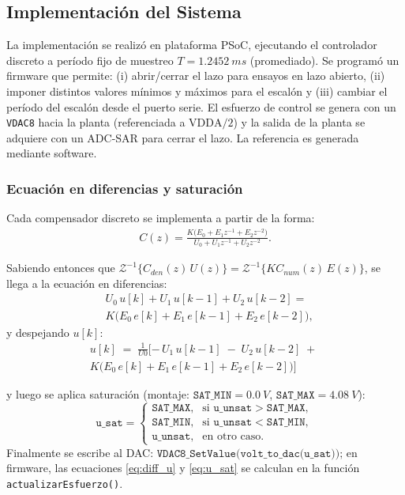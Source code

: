 \subsection{Implementación del Sistema}
La implementación se realizó en plataforma PSoC, ejecutando el controlador discreto a período fijo de muestreo \(T=\SI{1.2452}{ms}\) (promediado). Se programó un firmware que permite: (i) abrir/cerrar el lazo para ensayos en lazo abierto, (ii) imponer distintos valores mínimos y máximos para el escalón y (iii) cambiar el período del escalón desde el puerto serie. El esfuerzo de control se genera con un \texttt{VDAC8} hacia la planta (referenciada a \(\mathrm{VDDA}/2\)) y la salida de la planta se adquiere con un ADC-SAR para cerrar el lazo. La referencia es generada mediante software.

\subsubsection{Ecuación en diferencias y saturación}
Cada compensador discreto se implementa a partir de la forma:
\begin{equation}
	\label{eq:Cz_form}
	\begin{split}
		C(z)
		= \frac{K\big(E_0 + E_1 z^{-1} + E_2 z^{-2}\big)}
		{U_0 + U_1 z^{-1} + U_2 z^{-2}}.
	\end{split}
\end{equation}

Sabiendo entonces que \(\mathcal{Z}^{-1}\!\big\{C_{den}(z)\,U(z)\big\}=\mathcal{Z}^{-1}\!\big\{KC_{num}(z)\,E(z)\big\}\), se llega a la ecuación en diferencias:
\begin{equation}
	\label{eq:diff_balance}
	\begin{aligned}
		&U_0\,u[k] + U_1\,u[k-1] + U_2\,u[k-2]
		=\\
		 & K\Big(E_0\,e[k] + E_1\,e[k-1] + E_2\,e[k-2]\Big),
	\end{aligned}
\end{equation}
y despejando \(u[k]\):
\begin{equation}
	\label{eq:diff_u}
	\begin{split}
		u[k] \;=\;\frac{1}{U0}[
		-\,U_1\,u[k-1] \;-\; U_2\,u[k-2]
			\;+\; \\K\big(E_0\,e[k] + E_1\,e[k-1] + E_2\,e[k-2]\big)]
	\end{split}
\end{equation}


y luego se aplica saturación (montaje: \(\texttt{SAT\_MIN}=\SI{0.0}{V}\), \(\texttt{SAT\_MAX}=\SI{4.08}{V}\)):
\begin{equation}
	\label{eq:u_sat}
	\texttt{u\_sat}=
	\begin{cases}
		\texttt{SAT\_MAX}, & \text{si } \texttt{u\_unsat}>\texttt{SAT\_MAX},\\
		\texttt{SAT\_MIN}, & \text{si } \texttt{u\_unsat}<\texttt{SAT\_MIN},\\
		\texttt{u\_unsat}, & \text{en otro caso.}
	\end{cases}
\end{equation}
Finalmente se escribe al DAC: \(\texttt{VDAC8\_SetValue(volt\_to\_dac(u\_sat));}\)
en firmware, las ecuaciones \eqref{eq:diff_u} y \eqref{eq:u_sat} se calculan en la función \texttt{actualizarEsfuerzo()}.



